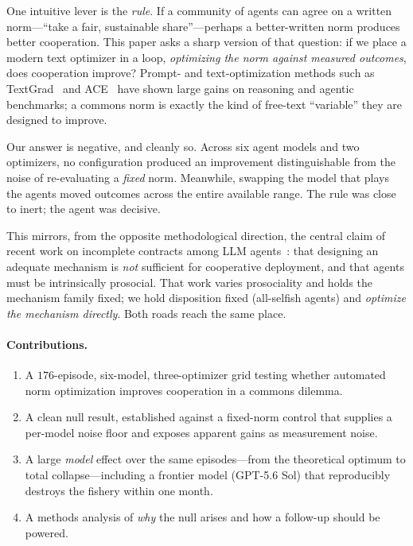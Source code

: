 \documentclass[11pt]{article}
\begin{document}
One intuitive lever is the \emph{rule}. If a community of agents can agree on a
written norm---``take a fair, sustainable share''---perhaps a better-written norm
produces better cooperation. This paper asks a sharp version of that question:
if we place a modern text optimizer in a loop, \emph{optimizing the norm against
measured outcomes}, does cooperation improve? Prompt- and text-optimization
methods such as TextGrad~\citep{textgrad} and ACE~\citep{ace} have shown large
gains on reasoning and agentic benchmarks; a commons norm is exactly the kind of
free-text ``variable'' they are designed to improve.

Our answer is negative, and cleanly so. Across six agent models and two
optimizers, no configuration produced an improvement distinguishable from the
noise of re-evaluating a \emph{fixed} norm. Meanwhile, swapping the model that
plays the agents moved outcomes across the entire available range. The rule was
close to inert; the agent was decisive.

This mirrors, from the opposite methodological direction, the central claim of
recent work on incomplete contracts among LLM agents~\citep{mechdesign}: that
designing an adequate mechanism is \emph{not} sufficient for cooperative
deployment, and that agents must be intrinsically prosocial. That work varies
prosociality and holds the mechanism family fixed; we hold disposition fixed
(all-selfish agents) and \emph{optimize the mechanism directly}. Both roads reach
the same place.

\paragraph{Contributions.}
\begin{enumerate}
  \item A $176$-episode, six-model, three-optimizer grid testing whether automated
  norm optimization improves cooperation in a commons dilemma.
  \item A clean null result, established against a fixed-norm control that supplies
  a per-model noise floor and exposes apparent gains as measurement noise.
  \item A large \emph{model} effect over the same episodes---from the theoretical
  optimum to total collapse---including a frontier model (GPT-5.6 Sol) that
  reproducibly destroys the fishery within one month.
  \item A methods analysis of \emph{why} the null arises and how a follow-up should
  be powered.
\end{enumerate}
\end{document}
